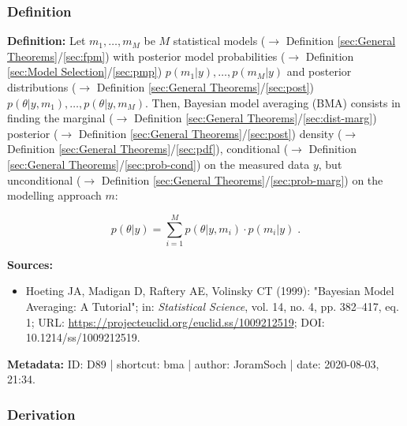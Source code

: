 \documentclass[a4paper,12pt,twoside]{book}
\begin{document}
\subsubsection[\textit{Definition}]{Definition} \label{sec:bma}
\setcounter{equation}{0}

\textbf{Definition:} Let $m_1, \ldots, m_M$ be $M$ statistical models ($\rightarrow$ Definition \ref{sec:General Theorems}/\ref{sec:fpm}) with posterior model probabilities ($\rightarrow$ Definition \ref{sec:Model Selection}/\ref{sec:pmp}) $p(m_1 \vert y), \ldots, p(m_M \vert y)$ and posterior distributions ($\rightarrow$ Definition \ref{sec:General Theorems}/\ref{sec:post}) $p(\theta \vert y, m_1), \ldots, p(\theta \vert y, m_M)$. Then, Bayesian model averaging (BMA) consists in finding the marginal ($\rightarrow$ Definition \ref{sec:General Theorems}/\ref{sec:dist-marg}) posterior ($\rightarrow$ Definition \ref{sec:General Theorems}/\ref{sec:post}) density ($\rightarrow$ Definition \ref{sec:General Theorems}/\ref{sec:pdf}), conditional ($\rightarrow$ Definition \ref{sec:General Theorems}/\ref{sec:prob-cond}) on the measured data $y$, but unconditional ($\rightarrow$ Definition \ref{sec:General Theorems}/\ref{sec:prob-marg}) on the modelling approach $m$:

\begin{equation} \label{eq:bma-BMA}
p(\theta|y) = \sum_{i=1}^{M} p(\theta|y,m_i) \cdot p(m_i|y) \; .
\end{equation}


\vspace{1em}
\textbf{Sources:}
\begin{itemize}
\item Hoeting JA, Madigan D, Raftery AE, Volinsky CT (1999): "Bayesian Model Averaging: A Tutorial"; in: \textit{Statistical Science}, vol. 14, no. 4, pp. 382–417, eq. 1; URL: \url{https://projecteuclid.org/euclid.ss/1009212519}; DOI: 10.1214/ss/1009212519.
\end{itemize}


\vspace{1em}
\textbf{Metadata:} ID: D89 | shortcut: bma | author: JoramSoch | date: 2020-08-03, 21:34.
\vspace{1em}



\subsubsection[\textbf{Derivation}]{Derivation} \label{sec:bma-der}
\setcounter{equation}{0}
\end{document}
